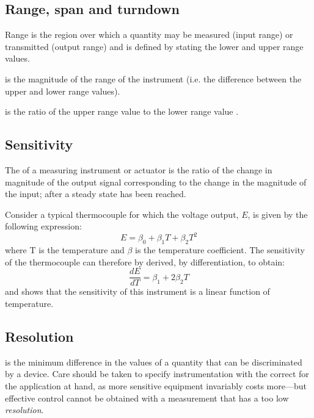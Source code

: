 \subsection{Range, span and turndown}
	\begin{description}
		\item{Range} is the region over which a quantity may be measured (input range) or transmitted (output 						range) and is defined by stating the lower and upper range values. 
 		\item [Span] is the magnitude of the range of the instrument (i.e. the difference between the upper and 					lower range values). 
		\item [Turndown] is the ratio of the upper range value to the lower range value \citep[529]{Richardson94}. 				
	\end{description}	

\subsection{Sensitivity}
The  of a  measuring instrument or actuator is the ratio of the change in magnitude of the output signal corresponding to the change in the magnitude of the input; after a steady state has been reached\citep[529]{Richardson94}. 
\begin{example}
	Consider a typical thermocouple for which the voltage output, $E$, is given by the following expression:
    		\[E = \beta_0 + \beta_1 T + \beta_2 T^2 \]
  where T is the temperature and $\beta$ is the temperature coefficient. The sensitivity of the 									thermocouple can therefore by derived, by differentiation, to obtain:
        \[\frac{dE}{dT} = \beta_1 + 2\beta_2 T \]
  and shows that the sensitivity of this instrument is a linear function of temperature.  	
\end{example}
 
\subsection{Resolution}
 is the minimum difference in the values of a quantity that can be discriminated by a device. Care should be taken to specify instrumentation with the correct  for the application at hand, as more sensitive equipment invariably costs more---but effective control cannot be obtained with a measurement that has a too low \emph{resolution}.


